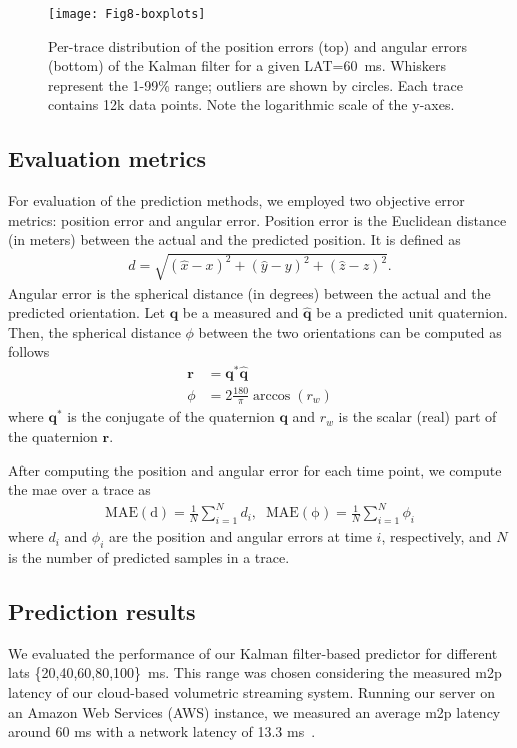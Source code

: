 \documentclass[sigconf]{acmart}			%
\begin{document}
\begin{figure}[t]
	\centering
	\texttt{[image: Fig8-boxplots]}
	\caption{Per-trace distribution of the position errors (top) and angular errors (bottom) of the Kalman filter for a given LAT=60~ms. Whiskers represent the 1-99\% range; outliers are shown by circles. Each trace contains 12k data points. Note the logarithmic scale of the y-axes.}
	\label{fig:boxplot1-99}
\end{figure}

\subsection{Evaluation metrics}
\label{sec:metrics}
For evaluation of the prediction methods, we employed two objective error metrics: position error and angular error. 
Position error is the Euclidean distance (in meters) between the actual and the predicted position. It is defined as
\begin{align}
	d = \sqrt{(\hat{x}-x)^2 + (\hat{y}-y)^2 + (\hat{z}-z)^2}.
\end{align}
Angular error is the spherical distance (in degrees) between the actual and the predicted orientation. 
Let $\mathbf{q}$ be a measured and $\mathbf{\hat{q}}$ be a predicted unit quaternion.
Then, the spherical distance $\phi$ between the two orientations can be computed as follows \cite{sola2017}
\begin{align}
	\mathbf{r} &=\mathbf{q^*}\mathbf{\hat{q}} \\
	\phi &= 2\frac{180}{\pi}\arccos(r_w)
\end{align}
where $\mathbf{q^*}$ is the conjugate of the quaternion  $\mathbf{q}$ and $r_w$ is the scalar (real) part of the quaternion $\mathbf{r}$. 

After computing the position and angular error for each time point, we compute the \gls{mae} over a trace as 
\begin{align}
	\mathrm{MAE(d)} = \frac{1}{N}\sum_{i=1}^{N}d_i,\;\;
	\mathrm{MAE(\phi)} = \frac{1}{N}\sum_{i=1}^{N}\phi_i
\end{align}
where $d_i$ and $\phi_i$ are the position and angular errors at time $i$, respectively, and $N$ is the number of predicted samples in a trace.

\subsection{Prediction results}
\label{sec:results}
We evaluated the performance of our Kalman filter-based predictor for different \glspl{lat} \{20,40,60,80,100\}~ms. 
This range was chosen considering the measured \gls{m2p} latency of our cloud-based volumetric streaming system.
Running our server on an Amazon Web Services (AWS) instance, we measured an average \gls{m2p} latency around 60 ms with a network latency of 13.3 ms~\cite{guel2020b}.
\end{document}
